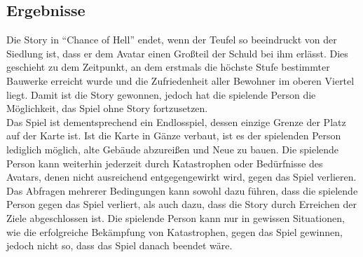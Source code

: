 \documentclass[paper=A4,pagesize=auto,12pt,headinclude=true,footinclude=true,BCOR=0mm,DIV=calc]{scrartcl}
\newcommand{\sectionspace}{
	\vspace{0.5cm}
}
\newcommand{\gametitle}{Chance of Hell}
\begin{document}
\subsection{Ergebnisse}\label{sec:Ergebnisse}
Die Story in "`\gametitle"' endet, wenn der Teufel so beeindruckt von der Siedlung ist, dass er dem Avatar einen Großteil der Schuld bei ihm erlässt. Dies geschieht zu dem Zeitpunkt, an dem erstmals die höchste Stufe bestimmter Bauwerke erreicht wurde und die Zufriedenheit aller Bewohner im oberen Viertel liegt. Damit ist die Story gewonnen, jedoch hat die spielende Person die Möglichkeit, das Spiel ohne Story fortzusetzen.\\ 
Das Spiel ist dementsprechend ein Endlosspiel, dessen einzige Grenze der Platz auf der Karte ist. Ist die Karte in Gänze verbaut, ist es der spielenden Person lediglich möglich, alte Gebäude abzureißen und Neue zu bauen. Die spielende Person kann weiterhin jederzeit durch Katastrophen oder Bedürfnisse des Avatars, denen nicht ausreichend entgegengewirkt wird, gegen das Spiel verlieren.\\
Das Abfragen mehrerer Bedingungen kann sowohl dazu führen, dass die spielende Person gegen das Spiel verliert, als auch dazu, dass die Story durch Erreichen der Ziele abgeschlossen ist. Die spielende Person kann nur in gewissen Situationen, wie die erfolgreiche Bekämpfung von Katastrophen, gegen das Spiel gewinnen, jedoch nicht so, dass das Spiel danach beendet wäre.


\sectionspace
\newpage
\printbibliography[heading=bibnumbered, title=Referenzen]\label{sec:Referenzen}
\end{document}
